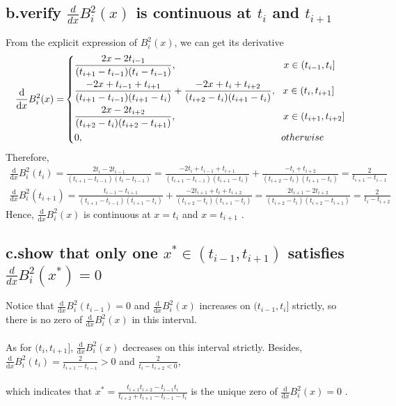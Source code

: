 \documentclass[twoside,a4paper]{article}
\newcommand{\dif}{\mathrm{d}}
\begin{document}
\subsection*{b.verify $\frac{d}{dx}B_i^2(x)$ is continuous at $t_i$ and $t_{i+1}$}
From the explicit expression of $B_i^2(x)$, we can get its derivative
\[\text{$\frac{\dif}{\dif x} B_i^2(x)=$}
\left\{
\begin{lgathered}
\frac{2x-2t_{i-1}}{(t_{i+1}-t_{i-1})(t_i-t_{i-1})},\qquad\qquad\qquad\qquad\qquad\quad x \in (t_{i-1},t_{i}]\\
\frac{-2x+t_{i-1}+t_{i+1}}{(t_{i+1}-t_{i-1})(t_{i+1}-t_i)}+\frac{-2x+t_i+t_{i+2}}{(t_{i+2}-t_i)(t_{i+1}-t_i)},\ \ x\in (t_{i},t_{i+1}]\\
\frac{2x-2t_{i+2}}{(t_{i+2}-t_i)(t_{i+2}-t_{i+1})}, \qquad \qquad\qquad\qquad\qquad\quad x \in (t_{i+1},t_{i+2}]\\
0, \qquad\qquad\qquad\qquad\qquad\qquad\qquad\qquad\qquad\qquad \ otherwise
\end{lgathered} 
\right.
\]
Therefore,
\begin{gather}
\frac{\dif}{\dif x} B_i^2(t_i)=\frac{2t_i-2t_{i-1}}{(t_{i+1}-t_{i-1})(t_i-t_{i-1})}=\frac{-2t_i+t_{i-1}+t_{i+1}}{(t_{i+1}-t_{i-1})(t_{i+1}-t_i)}+\frac{-t_i+t_{i+2}}{(t_{i+2}-t_i)(t_{i+1}-t_i)}=\frac{2}{t_{i+1}-t_{i-1}}\\
\frac{\dif}{\dif x} B_i^2(t_{i+1})=\frac{t_{i-1}-t_{i+1}}{(t_{i+1}-t_{i-1})(t_{i+1}-t_i)}+\frac{-2t_{i+1}+t_i+t_{i+2}}{(t_{i+2}-t_i)(t_{i+1}-t_i)}=\frac{2t_{i+1}-2t_{i+2}}{(t_{i+2}-t_i)(t_{i+2}-t_{i+1})}=\frac{2}{t_i-t_{i+2}}
\end{gather}
Hence, $\frac{\dif}{\dif x}B_i^2(x)$ is continuous at $x=t_i$ and $x=t_{i+1}$ .
\subsection*{c.show that only one $x^* \in(t_{i-1},t_{i+1})$ satisfies $\frac{d}{dx}B_i^2(x^*)=0$}
Notice that $\frac{\dif}{\dif x} B_i^2(t_{i-1})=0$ and $\frac{\dif}{\dif x} B_i^2(x)$ increases on $(t_{i-1},t_i]$ strictly, so there is no zero of  $\frac{\dif}{\dif x} B_i^2(x)$ in this interval. \\ \\As for $(t_i,t_{i+1}]$, $\frac{\dif}{\dif x} B_i^2(x)$ decreases on this interval
strictly. Besides, $\frac{\dif}{\dif x} B_i^2(t_i)=\frac{2}{t_{i+1}-t_{i-1}}>0$ and $\frac{2}{t_{i}-t_{i+2}<0}$,\\ \\which indicates that $x^*=\frac{t_{i+1}t_{i+2}-t_{i-1}t_i}{t_{i+2}+t_{i+1}-t_{i-1}-t_i}$ is the unique zero of $\frac{\dif}{\dif x} B_i^2(x)=0$ .
\end{document}
